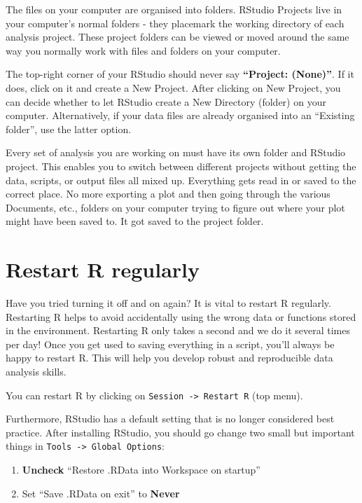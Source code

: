 \documentclass[
  12pt,
  krantz2]{krantz}
\providecommand{\tightlist}{%
  \setlength{\itemsep}{0pt}\setlength{\parskip}{0pt}}
\renewenvironment{quote}{\begin{VF}}{\end{VF}}
\begin{document}
The files on your computer are organised into folders.
RStudio Projects live in your computer's normal folders - they placemark the working directory of each analysis project.
These project folders can be viewed or moved around the same way you normally work with files and folders on your computer.

The top-right corner of your RStudio should never say \textbf{``Project: (None)''}.
If it does, click on it and create a New Project.
After clicking on New Project, you can decide whether to let RStudio create a New Directory (folder) on your computer. Alternatively, if your data files are already organised into an ``Existing folder'', use the latter option.

Every set of analysis you are working on must have its own folder and RStudio project.
This enables you to switch between different projects without getting the data, scripts, or output files all mixed up.
Everything gets read in or saved to the correct place.
No more exporting a plot and then going through the various Documents, etc., folders on your computer trying to figure out where your plot might have been saved to.
It got saved to the project folder.

\hypertarget{restart-r-regularly}{%
\section{Restart R regularly}\label{restart-r-regularly}}

Have you tried turning it off and on again? It is vital to restart R regularly.
Restarting R helps to avoid accidentally using the wrong data or functions stored in the environment.
Restarting R only takes a second and we do it several times per day!
Once you get used to saving everything in a script, you'll always be happy to restart R.
This will help you develop robust and reproducible data analysis skills.

\begin{quote}
You can restart R by clicking on \texttt{Session\ -\textgreater{}\ Restart\ R} (top menu).
\end{quote}

Furthermore, RStudio has a default setting that is no longer considered best practice.
After installing RStudio, you should go change two small but important things in \texttt{Tools\ -\textgreater{}\ Global\ Options}:

\begin{enumerate}
\def\labelenumi{\arabic{enumi}.}
\tightlist
\item
  \textbf{Uncheck} ``Restore .RData into Workspace on startup''
\item
  Set ``Save .RData on exit'' to \textbf{Never}
\end{enumerate}
\end{document}
